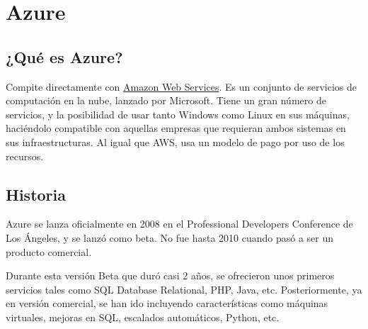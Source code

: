 \chapter{Azure}
\hypertarget{azure}{}
\section{¿Qué es Azure?}
Compite directamente con \hyperlink{AWS}{Amazon Web Services}. Es un conjunto de servicios de computación en la nube, lanzado por Microsoft. Tiene un gran número de servicios, y la posibilidad de usar tanto Windows como Linux en sus máquinas, haciéndolo compatible con aquellas empresas que requieran ambos sistemas en sus infraestructuras. Al igual que AWS, usa un modelo de pago por uso de los recursos.

\section{Historia}
Azure se lanza oficialmente en 2008 en el Professional Developers Conference de Los Ángeles, y se lanzó como beta. No fue hasta 2010 cuando pasó a ser un producto comercial.

Durante esta versión Beta que duró casi 2 años, se ofrecieron unos primeros servicios tales como SQL Database Relational, PHP, Java, etc. Posteriormente, ya en versión comercial, se han ido incluyendo características como máquinas virtuales, mejoras en SQL, escalados automáticos, Python, etc.

